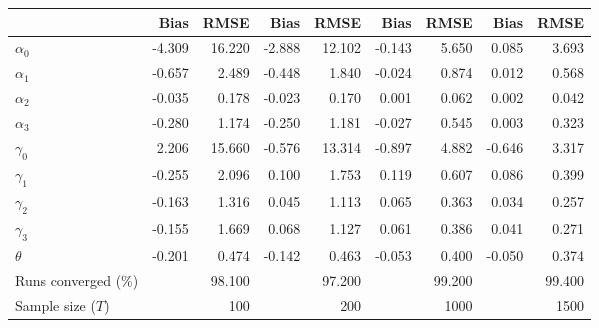 
\begin{tabular}[t]{lrrrrrrrr}
\toprule
  & Bias & RMSE & Bias & RMSE & Bias & RMSE & Bias & RMSE\\
\midrule
$\alpha_{0}$ & -4.309 & 16.220 & -2.888 & 12.102 & -0.143 & 5.650 & 0.085 & 3.693\\
$\alpha_{1}$ & -0.657 & 2.489 & -0.448 & 1.840 & -0.024 & 0.874 & 0.012 & 0.568\\
$\alpha_{2}$ & -0.035 & 0.178 & -0.023 & 0.170 & 0.001 & 0.062 & 0.002 & 0.042\\
$\alpha_{3}$ & -0.280 & 1.174 & -0.250 & 1.181 & -0.027 & 0.545 & 0.003 & 0.323\\
$\gamma_{0}$ & 2.206 & 15.660 & -0.576 & 13.314 & -0.897 & 4.882 & -0.646 & 3.317\\
$\gamma_{1}$ & -0.255 & 2.096 & 0.100 & 1.753 & 0.119 & 0.607 & 0.086 & 0.399\\
$\gamma_{2}$ & -0.163 & 1.316 & 0.045 & 1.113 & 0.065 & 0.363 & 0.034 & 0.257\\
$\gamma_{3}$ & -0.155 & 1.669 & 0.068 & 1.127 & 0.061 & 0.386 & 0.041 & 0.271\\
$\theta$ & -0.201 & 0.474 & -0.142 & 0.463 & -0.053 & 0.400 & -0.050 & 0.374\\
Runs converged (\%) &  & 98.100 &  & 97.200 &  & 99.200 &  & 99.400\\
Sample size ($T$) &  & 100 &  & 200 &  & 1000 &  & 1500\\
\bottomrule
\end{tabular}
